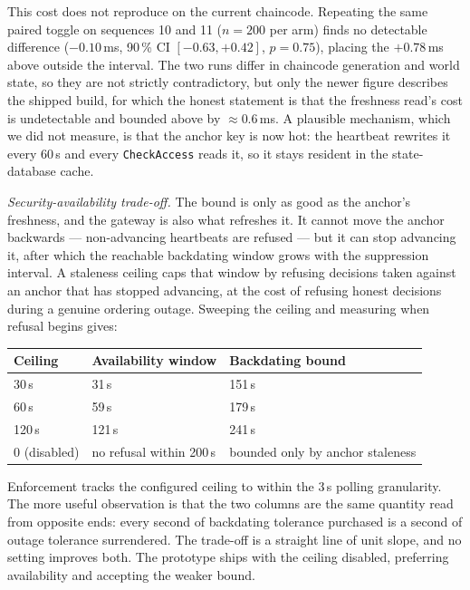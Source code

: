 \documentclass[preprint,12pt]{elsarticle}
\begin{document}
This cost does not reproduce on the current chaincode. Repeating the same
paired toggle on sequences 10 and 11 ($n{=}200$ per arm) finds no detectable
difference ($-0.10$\,ms, 90\,\% CI $[-0.63, +0.42]$, $p = 0.75$), placing the
$+0.78$\,ms above outside the interval. The two runs differ in chaincode
generation and world state, so they are not strictly contradictory, but only
the newer figure describes the shipped build, for which the honest statement is
that the freshness read's cost is undetectable and bounded above by
$\approx$0.6\,ms. A plausible mechanism, which we did not measure, is that the
anchor key is now hot: the heartbeat rewrites it every 60\,s and every
\texttt{CheckAccess} reads it, so it stays resident in the state-database
cache.

\emph{Security-availability trade-off.} The bound is only as good as the
anchor's freshness, and the gateway is also what refreshes it. It cannot move
the anchor backwards --- non-advancing heartbeats are refused --- but it can stop
advancing it, after which the reachable backdating window grows with the
suppression interval. A staleness ceiling caps that window by refusing decisions
taken against an anchor that has stopped advancing, at the cost of refusing
honest decisions during a genuine ordering outage. Sweeping the ceiling and
measuring when refusal begins gives:

\begin{center}
\begin{tabular}{@{}lll@{}}
\toprule
\textbf{Ceiling} & \textbf{Availability window} & \textbf{Backdating bound} \\
\midrule
30\,s  & 31\,s  & 151\,s \\
60\,s  & 59\,s  & 179\,s \\
120\,s & 121\,s & 241\,s \\
0 (disabled) & no refusal within 200\,s & bounded only by anchor staleness \\
\bottomrule
\end{tabular}
\end{center}

Enforcement tracks the configured ceiling to within the 3\,s polling
granularity. The more useful observation is that the two columns are the same
quantity read from opposite ends: every second of backdating tolerance
purchased is a second of outage tolerance surrendered. The trade-off is a
straight line of unit slope, and no setting improves both. The prototype ships
with the ceiling disabled, preferring availability and accepting the weaker
bound.
\end{document}
